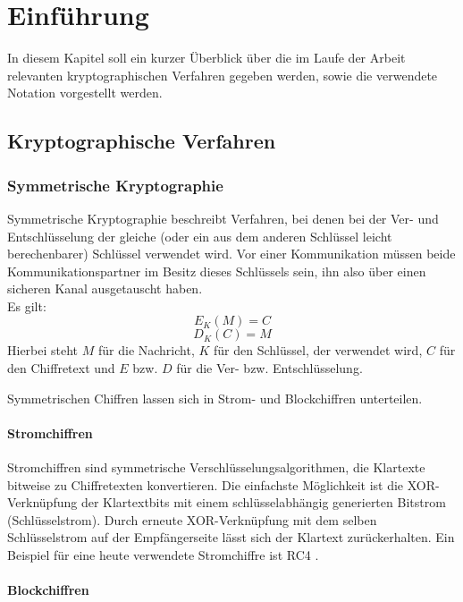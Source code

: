 \chapter{Einführung}

\label{cha_cryptographic_techniques}

In diesem Kapitel soll ein kurzer Überblick über die im Laufe der Arbeit relevanten kryptographischen Verfahren gegeben werden, sowie die verwendete Notation vorgestellt werden.

\section{Kryptographische Verfahren}


\subsection{Symmetrische Kryptographie}

Symmetrische Kryptographie beschreibt Verfahren, bei denen bei der Ver- und Entschlüsselung der gleiche (oder ein aus dem anderen Schlüssel leicht berechenbarer) Schlüssel verwendet wird. Vor einer Kommunikation müssen beide Kommunikationspartner im Besitz dieses Schlüssels sein, ihn also über einen sicheren Kanal ausgetauscht haben.\\
Es gilt:
\[E_K(M)=C\] 
\[D_K(C)=M\] 
Hierbei steht \(M\) für die Nachricht, \(K\) für den Schlüssel, der verwendet wird, \(C\) für den Chiffretext und \(E\) bzw. \(D\) für die Ver- bzw. Entschlüsselung.

Symmetrischen Chiffren lassen sich in Strom- und Blockchiffren unterteilen.

\subsubsection{Stromchiffren}

Stromchiffren sind symmetrische Verschlüsselungsalgorithmen, die Klartexte bitweise zu Chiffretexten konvertieren. Die einfachste Möglichkeit ist die XOR-Verknüpfung der Klartextbits mit einem schlüsselabhängig generierten Bitstrom (Schlüsselstrom). Durch erneute XOR-Verknüpfung mit dem selben Schlüsselstrom auf der Empfängerseite lässt sich der Klartext zurückerhalten. Ein Beispiel für eine heute verwendete Stromchiffre ist RC4 \cite{Schneier2006}.

\subsubsection{Blockchiffren}

